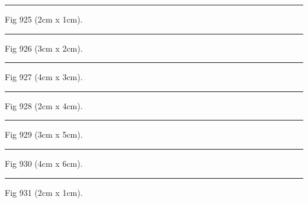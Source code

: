 \documentclass[a4paper,11pt]{article}
\begin{document}
\begin{swarmwrap}%
  \begin{minipage}[t]{2cm}
    \centering
    \rule{\linewidth}{1cm}
    {\footnotesize Fig 925 (2cm x 1cm).}
  \end{minipage}%
\end{swarmwrap}%
\swarmwrapnext
\lipsum[25]%

\begin{swarmwrap}%
  \begin{minipage}[t]{3cm}
    \centering
    \rule{\linewidth}{2cm}
    {\footnotesize Fig 926 (3cm x 2cm).}
  \end{minipage}%
\end{swarmwrap}%
\swarmwrapnext
\lipsum[26]%

\begin{swarmwrap}%
  \begin{minipage}[t]{4cm}
    \centering
    \rule{\linewidth}{3cm}
    {\footnotesize Fig 927 (4cm x 3cm).}
  \end{minipage}%
\end{swarmwrap}%
\swarmwrapnext
\lipsum[27]%

\begin{swarmwrap}%
  \begin{minipage}[t]{2cm}
    \centering
    \rule{\linewidth}{4cm}
    {\footnotesize Fig 928 (2cm x 4cm).}
  \end{minipage}%
\end{swarmwrap}%
\swarmwrapnext
\lipsum[28]%

\begin{swarmwrap}%
  \begin{minipage}[t]{3cm}
    \centering
    \rule{\linewidth}{5cm}
    {\footnotesize Fig 929 (3cm x 5cm).}
  \end{minipage}%
\end{swarmwrap}%
\swarmwrapnext
\lipsum[29]%

\begin{swarmwrap}%
  \begin{minipage}[t]{4cm}
    \centering
    \rule{\linewidth}{6cm}
    {\footnotesize Fig 930 (4cm x 6cm).}
  \end{minipage}%
\end{swarmwrap}%
\swarmwrapnext
\lipsum[30]%

\begin{swarmwrap}%
  \begin{minipage}[t]{2cm}
    \centering
    \rule{\linewidth}{1cm}
    {\footnotesize Fig 931 (2cm x 1cm).}
  \end{minipage}%
\end{swarmwrap}%
\swarmwrapnext
\lipsum[31]%
\end{document}
